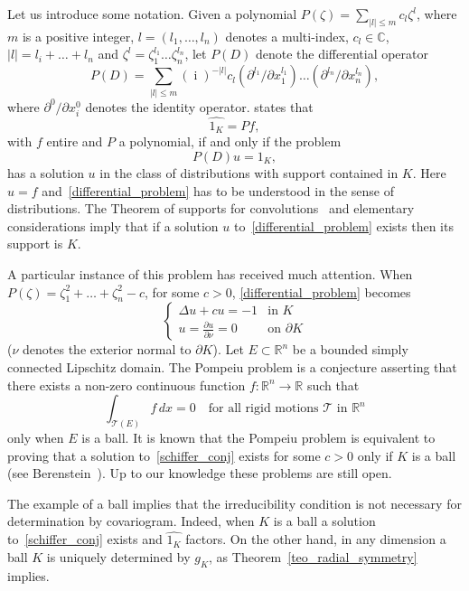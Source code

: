 \documentclass[a4paper]{amsart}
\theoremstyle{definition}
\numberwithin{equation}{section}
\begin{document}
Let us introduce some notation. Given a polynomial $P({{\zeta}})=\sum_{|l|\leq m}c_l {{\zeta}}^l$, where $m$ is a positive integer,  $l=(l_1,\dots,l_n)$ denotes a multi-index, $c_l\in{\mathbb{C}}$,  $|l|=l_i+\dots+l_n$ and ${{\zeta}}^l={{\zeta}}_1^{l_1}\dots{{\zeta}}_n^{l_n}$, let  $P(D)$ denote the differential operator
\[
P(D)=\sum_{|l|\leq m}({\operatorname{i}})^{-|l|}c_l\left({{\partial}}^{l_1}/{{\partial}} x_1^{l_1}\right)\dots\left({{\partial}}^{l_n}/{{\partial}} x_n^{l_n}\right),
\]
where ${{\partial}}^{0}/{{\partial}} x_i^{0}$ denotes the identity operator.
\cite[Theorem~8.4]{Rudin-91} states that
\[
{\widehat{{{1_K}}}}=Pf,
\]
with $f$ entire  and $P$ a polynomial, if and only if the problem
\begin{equation}\label{differential_problem}
 P(D)u=1_K,
\end{equation}
has a solution $u$ in the class of distributions with support contained in $K$. Here ${\widehat{{{u}}}}=f$ and~\eqref{differential_problem} has to be understood in the sense of distributions. The Theorem of supports for convolutions~\cite[Theorem~4.3.3]{Hormander-1983} and elementary considerations imply that if a solution $u$ to~\eqref{differential_problem} exists then its support is $K$. 

A particular instance of this problem has received much attention. When $P({{\zeta}})={{\zeta}}_1^2+\dots+{{\zeta}}_n^2-c$, for some $c>0$, \eqref{differential_problem} becomes
\begin{equation}\label{schiffer_conj}
\begin{cases}
 \Delta u+c u=-1 &\text{in $K$}\\
 u=\frac{{{\partial}} u}{{{\partial}} \nu}=0 &\text{on ${{\partial}} K$}
\end{cases}
\end{equation}
($\nu$ denotes the exterior normal to ${{\partial}} K$). Let $E\subset{\mathbb{R}}^n$ be a bounded simply connected Lipschitz domain. The Pompeiu problem is a conjecture asserting that there exists  a non-zero continuous function $f:{\mathbb{R}}^n\to{\mathbb{R}}$ such that
\[
\int_{{{\mathcal T}}(E)} f\, dx=0\quad\text{for all rigid motions ${{\mathcal T}}$ in ${\mathbb{R}}^n$}
\]
only when $E$ is a ball. It is known that the Pompeiu problem is equivalent to proving that a solution to~\eqref{schiffer_conj} exists for some $c>0$ only if $K$ is a ball (see Berenstein~\cite{Berenstein-1980}). Up to our knowledge these problems are still open.

The example of a ball implies that the irreducibility condition is not necessary for determination by covariogram. Indeed, when $K$ is a ball a solution to~\eqref{schiffer_conj} exists and ${\widehat{{{1_K}}}}$ factors. On the other hand, in any dimension a ball $K$ is uniquely determined by $g_K$, as  Theorem~\ref{teo_radial_symmetry} implies.
\end{document}

